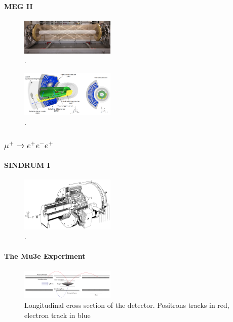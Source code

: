 \paragraph{MEG II}
\cite{megiicollaboration2024operation}
\cite{megiicollaboration2024search}
\begin{figure}[!h]
\centering
\includegraphics[width =0.4\textwidth]{figures/png/Screenshot_20240307_140235.png}
\caption{.}
\label{fig:meg2}
\end{figure}
\begin{figure}[!h]
\centering
\includegraphics[width =0.4\textwidth]{figures/png/Screenshot_20240307_140116.png}
\caption{.}
\label{fig:meg22}
\end{figure}
\subsubsection{$\mu^+ \rightarrow e^+ e^-  e^+ $}
\paragraph{SINDRUM I}
\cite{sindrumi}
\begin{figure}[!h]
\centering
\includegraphics[width =0.4\textwidth]{figures/png/The-SINDRUM-I-detector-in-the-horizontal-operating-orientation.png}
\caption{.}
\label{fig:sindrumi}
\end{figure}
\paragraph{The Mu3e Experiment}

\begin{figure}[!h]
\centering
\includegraphics[width =0.4\textwidth]{figures/png/Screenshot_20240307_161651.png}
\caption{Longitudinal cross section of the detector. Positrons tracks in red, electron
track in blue \cite{hesketh2022mu3e}}
\label{fig:mu3e}
\end{figure}
